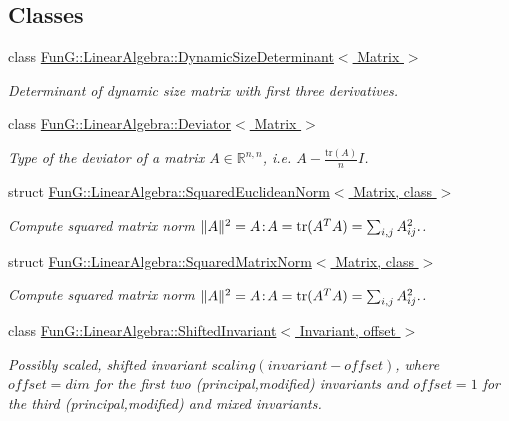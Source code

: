 \subsection*{Classes}
\begin{DoxyCompactItemize}
\item 
class \hyperlink{classFunG_1_1LinearAlgebra_1_1DynamicSizeDeterminant}{Fun\-G\-::\-Linear\-Algebra\-::\-Dynamic\-Size\-Determinant$<$ Matrix $>$}
\begin{DoxyCompactList}\small\item\em Determinant of dynamic size matrix with first three derivatives. \end{DoxyCompactList}\item 
class \hyperlink{classFunG_1_1LinearAlgebra_1_1Deviator}{Fun\-G\-::\-Linear\-Algebra\-::\-Deviator$<$ Matrix $>$}
\begin{DoxyCompactList}\small\item\em Type of the deviator of a matrix $ A\in\mathbb{R}^{n,n} $, i.\-e. $ A - \frac{\mathrm{tr}(A)}{n}I $. \end{DoxyCompactList}\item 
struct \hyperlink{structFunG_1_1LinearAlgebra_1_1SquaredEuclideanNorm}{Fun\-G\-::\-Linear\-Algebra\-::\-Squared\-Euclidean\-Norm$<$ Matrix, class $>$}
\begin{DoxyCompactList}\small\item\em Compute squared matrix norm $ \|A\|^2 = A\negthinspace : \negthinspace A = \mathrm{tr}(A^TA) = \sum_{i,j} A_{ij}^2. $. \end{DoxyCompactList}\item 
struct \hyperlink{structFunG_1_1LinearAlgebra_1_1SquaredMatrixNorm}{Fun\-G\-::\-Linear\-Algebra\-::\-Squared\-Matrix\-Norm$<$ Matrix, class $>$}
\begin{DoxyCompactList}\small\item\em Compute squared matrix norm $ \|A\|^2 = A\negthinspace : \negthinspace A = \mathrm{tr}(A^TA) = \sum_{i,j} A_{ij}^2. $. \end{DoxyCompactList}\item 
class \hyperlink{classFunG_1_1LinearAlgebra_1_1ShiftedInvariant}{Fun\-G\-::\-Linear\-Algebra\-::\-Shifted\-Invariant$<$ Invariant, offset $>$}
\begin{DoxyCompactList}\small\item\em Possibly scaled, shifted invariant $scaling (invariant - offset)$, where $offset = dim$ for the first two (principal,modified) invariants and $offset = 1$ for the third (principal,modified) and mixed invariants. \end{DoxyCompactList}\item 

\end{DoxyCompactItemize}
